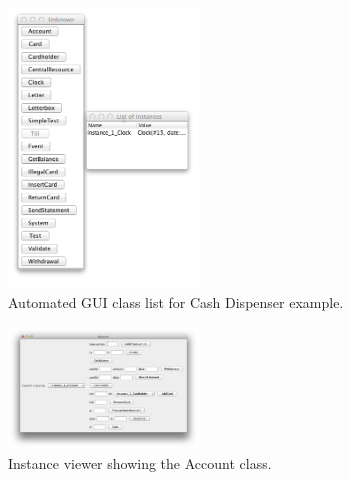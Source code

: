\begin{figure}[!ht]
\begin{center}
  \includegraphics[width=0.45\textwidth]{screendumps/guibuilder-instances}
  \caption[labelInTOC]{Automated GUI class list for Cash Dispenser example.}
  \label{fig:guibuilder-instances}
\end{center}
\end{figure}

\begin{figure}[!ht]
\begin{center}
  \includegraphics[width=0.45\textwidth]{screendumps/guibuilder-account}
  \caption[labelInTOC]{Instance viewer showing the Account class.}
  \label{fig:guibuilder-account}
\end{center}
\end{figure}
